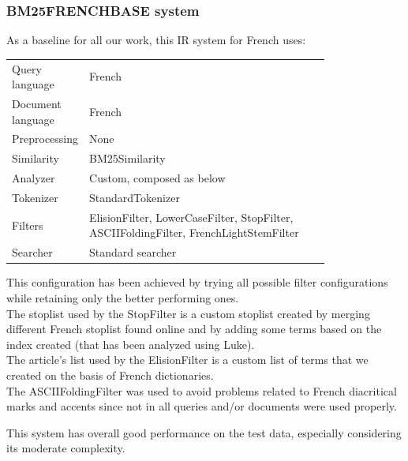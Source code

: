 \subsubsection{BM25FRENCHBASE system}
\label{subsub:BM25FRENCHBASE}
As a baseline for all our work, this IR system for French uses:
\begin{table}[h!]
    \centering
    \begin{tabular}{l p{0.8\linewidth}}
    Query language & French\\
    Document language & French\\
    Preprocessing & None\\
    Similarity & BM25Similarity\\
    Analyzer & Custom, composed as below\\
    Tokenizer & StandardTokenizer\\
    Filters & ElisionFilter, LowerCaseFilter, StopFilter, ASCIIFoldingFilter, FrenchLightStemFilter\\
    Searcher & Standard searcher
    \end{tabular}
\end{table}
\par This configuration has been achieved by trying all possible filter configurations while retaining only the better performing ones.
\\
The stoplist used by the StopFilter is a custom stoplist created by merging different French stoplist found online and by adding some terms based on the index created (that has been analyzed using Luke).
\\ 
The article's list used by the ElisionFilter is a custom list of terms that we created on the basis of French dictionaries. 
\\
The ASCIIFoldingFilter was used to avoid problems related to French diacritical marks and accents since not in all queries and/or documents were used properly.
\par
This system has overall good performance on the test data, especially considering its moderate complexity.

